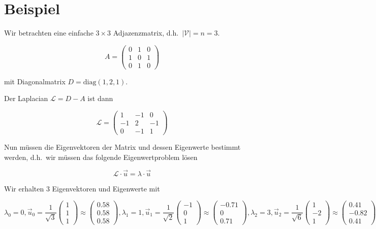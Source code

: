 \section{Beispiel}

Wir betrachten eine einfache $3 \times 3$ Adjazenzmatrix, d.h.\ $|\mathcal{V}| = n = 3$.

\begin{equation}
  A = \begin{pmatrix}
    0 & 1 & 0\\
    1 & 0 & 1\\
    0 & 1 & 0
  \end{pmatrix}
\end{equation}

mit Diagonalmatrix $D = \text{diag}(1, 2, 1)$.

Der Laplacian $\mathcal{L} = D - A$ ist dann

\begin{equation}
  \mathcal{L} = \begin{pmatrix}
    1 & -1 & 0\\
    -1 & 2 & -1\\
    0 & -1 & 1
  \end{pmatrix}
\end{equation}

Nun müssen die Eigenvektoren der Matrix und dessen Eigenwerte bestimmt werden, d.h.\ wir müssen das folgende Eigenwertproblem lösen

\begin{equation}
  \mathcal{L} \cdot \vec{u} = \lambda \cdot \vec{u}
\end{equation}

Wir erhalten $3$ Eigenvektoren und Eigenwerte mit

\begin{equation}
  \lambda_0 = 0, \vec{u}_0 = \frac{1}{\sqrt{3}} \begin{pmatrix}1\\1\\1\end{pmatrix} \approx \begin{pmatrix}0.58\\0.58\\0.58\end{pmatrix},
    \lambda_1 = 1, \vec{u}_1 = \frac{1}{\sqrt{2}} \begin{pmatrix}-1\\0\\1\end{pmatrix} \approx \begin{pmatrix}-0.71\\0\\0.71\end{pmatrix},
      \lambda_2 = 3, \vec{u}_2 = \frac{1}{\sqrt{6}} \begin{pmatrix}1\\-2\\1\end{pmatrix} \approx \begin{pmatrix}0.41\\-0.82\\0.41\end{pmatrix}
\end{equation}

